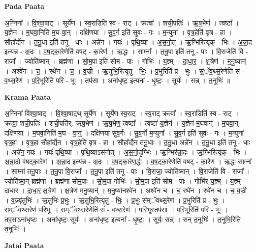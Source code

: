 \documentclass[17pt]{extarticle}
\begin{document}
\textbf{Pada Paata} \newline

अ॒ग्निना᳚ । वि॒श्वा॒षाट् । सूर्ये॑ण । स्व॒राडिति॑ स्व - राट् । क्रत्वा᳚ । शची॒पतिः॑ । ऋ॒ष॒भेण॑ । त्वष्टा᳚ । य॒ज्ञेन॑ । म॒घवा॒निति॑ म॒घ-वा॒न् । दक्षि॑णया । सु॒व॒र्ग इति॑ सुवः - गः । म॒न्युना᳚ । वृ॒त्र॒हेति॑ वृत्र - हा । सौहा᳚र्द्येन । त॒नू॒धा इति॑ तनू - धाः । अन्ने॑न । गयः॑ । पृ॒थि॒व्या । अ॒स॒नो॒त् । ऋ॒ग्भिरित्यृ॑क् - भिः । अ॒न्ना॒द इत्य॑न्न - अ॒दः । व॒ष॒ट्का॒रेणेति॑ वषट् - का॒रेण॑ । ऋ॒द्धः । साम्ना᳚ । त॒नू॒पा इति॑ तनू - पाः । वि॒राजेति॑ वि - राजा᳚ । ज्योति॑ष्मान् । ब्रह्म॑णा । सो॒म॒पा इति॑ सोम - पाः । गोभिः॑ । य॒ज्ञ्म् । दा॒धा॒र॒ । क्ष॒त्रेण॑ । म॒नु॒ष्यान्॑ । अश्वे॑न । च॒ । रथे॑न । च॒ । व॒ज्री । ऋ॒तुभि॒रित्यृ॒तु - भिः॒ । प्र॒भुरिति॑ प्र - भुः । सं॒ॅव॒थ्स॒रेणेति॑ सं - व॒थ्स॒रेण॑ । प॒रि॒भूरिति॑ परि - भूः । तप॑सा । अना॑धृष्ट॒ इत्यना᳚ - धृ॒ष्टः॒ । सूर्यः॑ । सन्न् । त॒नूभिः॑ ॥  \newline


\textbf{Krama Paata} \newline

अ॒ग्निना॑ विश्वा॒षाट् । वि॒श्वा॒षाट्थ् सूर्ये॑ण । सूर्ये॑ण स्व॒राट् । स्व॒राट् क्रत्वा᳚ । स्व॒राडिति॑ स्व - राट् । क्रत्वा॒ शची॒पतिः॑ । शची॒पति॑र्. ऋष॒भेण॑ । ऋ॒ष॒भेण॒ त्वष्टा᳚ । त्वष्टा॑ य॒ज्ञेन॑ । य॒ज्ञेन॑ म॒घवान्॑ । म॒घवा॒न् दक्षि॑णया । म॒घवा॒निति॑ म॒घ - वा॒न्॒ । दक्षि॑णया सुव॒र्गः । सु॒व॒र्गो म॒न्युना᳚ । सु॒व॒र्ग इति॑ सुवः - गः । म॒न्युना॑ वृत्र॒हा । वृ॒त्र॒हा सौहा᳚र्द्येन । वृ॒त्र॒हेति॑ वृत्र - हा । सौहा᳚र्द्येन तनू॒धाः । त॒नू॒धा अन्ने॑न । त॒नू॒धा इति॑ तनू - धाः । अन्ने॑न॒ गयः॑ । गयः॑ पृथि॒व्या । पृ॒थि॒व्याऽस॑नोत् । अ॒स॒नो॒दृ॒ग्भिः । ऋ॒ग्भिर॑न्ना॒दः । ऋ॒ग्भिरित्यृ॑क् - भिः । अ॒न्ना॒दो व॑षट्का॒रेण॑ । अ॒न्ना॒द इत्य॑न्न - अ॒दः । व॒ष॒ट्का॒रेण॒र्द्धः । व॒ष॒ट्का॒रेणेति॑ वषट् - का॒रेण॑ । ऋ॒द्धः साम्ना᳚ । साम्ना॑ तनू॒पाः । त॒नू॒पा वि॒राजा᳚ । त॒नू॒पा इति॑ तनू - पाः । वि॒राजा॒ ज्योति॑ष्मान् । वि॒राजेति॑ वि - राजा᳚ । ज्योति॑ष्मा॒न् ब्रह्म॑णा । ब्रह्म॑णा सोम॒पाः । सो॒म॒पा गोभिः॑ । सो॒म॒पा इति॑ सोम - पाः । गोभि॑र् य॒ज्ञ्म् । य॒ज्ञ्म् दा॑धार । दा॒धा॒र॒ क्ष॒त्रेण॑ । क्ष॒त्रेण॑ मनु॒ष्यान्॑ । म॒नु॒ष्या॑नश्वे॑न । अश्वे॑न च । च॒ रथे॑न । रथे॑न च । च॒ व॒ज्री । व॒ज्र्यृ॑तुभिः॑ । ऋ॒तुभिः॑ प्र॒भुः । ऋ॒तुभि॒रित्यृ॒तु - भिः॒ । प्र॒भुः स॑म्ॅवथ्स॒रेण॑ । प्र॒भुरिति॑ प्र - भुः । स॒म्ॅव॒थ्स॒रेण॑ परि॒भूः । स॒म्ॅव॒थ्स॒रेणेति॑ सं - व॒थ्स॒रेण॑ । प॒रि॒भूस्तप॑सा । प॒रि॒भूरिति॑ परि - भूः । तप॒साऽना॑धृष्टः । अना॑धृष्टः॒ सूर्यः॑ । अना॑धृष्ट॒ इत्यना᳚ - धृ॒ष्टः॒ । सूर्यः॒ सन्न् । सन् त॒नूभिः॑ । त॒नूभि॒रिति॑ त॒नूभिः॑ । \newline

\textbf{Jatai Paata} \newline
\end{document}
